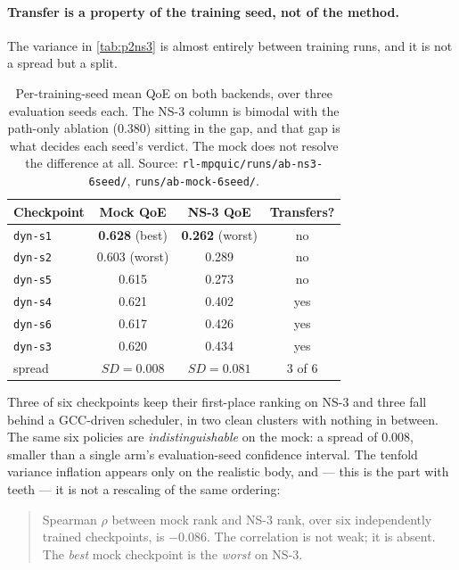 \paragraph{Transfer is a property of the training seed, not of the method.} The variance in
\cref{tab:p2ns3} is almost entirely between training runs, and it is not a spread but a split.

\begin{table}[t]
  \centering
  \caption[Per-training-seed mean QoE on both backends]{Per-training-seed mean QoE on both backends, over three evaluation seeds each. The NS-3
  column is bimodal with the path-only ablation (0.380) sitting in the gap, and that gap is what decides
  each seed's verdict. The mock does not resolve the difference at all. Source:
  \texttt{rl-mpquic/runs/ab-ns3-6seed/}, \texttt{runs/ab-mock-6seed/}.}
  \label{tab:p2seeds}
  \begin{tabular}{lccc}
    \toprule
    Checkpoint & Mock QoE & NS-3 QoE & Transfers? \\
    \midrule
    \texttt{dyn-s1} & \textbf{0.628} (best) & \textbf{0.262} (worst) & no \\
    \texttt{dyn-s2} & 0.603 (worst) & 0.289 & no \\
    \texttt{dyn-s5} & 0.615 & 0.273 & no \\
    \texttt{dyn-s4} & 0.621 & 0.402 & yes \\
    \texttt{dyn-s6} & 0.617 & 0.426 & yes \\
    \texttt{dyn-s3} & 0.620 & 0.434 & yes \\
    \midrule
    spread & $\mathit{SD} = 0.008$ & $\mathit{SD} = 0.081$ & 3 of 6 \\
    \bottomrule
  \end{tabular}
\end{table}

Three of six checkpoints keep their first-place ranking on NS-3 and three fall behind a GCC-driven
scheduler, in two clean clusters with nothing in between. The same six policies are \emph{indis\-tin\-guishable}
on the mock: a spread of 0.008, smaller than a single arm's evaluation-seed confidence interval. The
tenfold variance inflation appears only on the realistic body, and --- this is the part with teeth --- it
is not a rescaling of the same ordering:

\begin{quote}
Spearman $\rho$ between mock rank and NS-3 rank, over six independently trained checkpoints, is
$-0.086$. The correlation is not weak; it is absent. The \emph{best} mock checkpoint is the
\emph{worst} on NS-3.
\end{quote}

